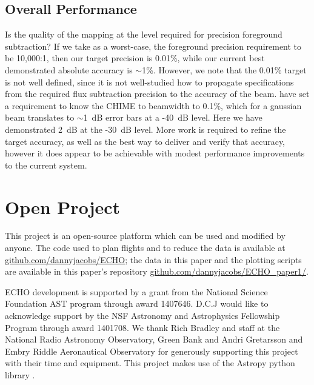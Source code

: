 \documentclass[preprint2,numberedappendix,tighten,twocolappendix]{aastex6}
\begin{document}
\subsection{Overall Performance}

Is the quality of the mapping at the level required for precision foreground subtraction?   If we take as a worst-case, the foreground precision requirement to be 10,000:1, then our target precision is 0.01\%, while our current best demonstrated absolute accuracy is $\sim$1\%.  However, we note that the 0.01\% target is not well defined, since it is not well-studied how to propagate specifications from the required flux subtraction precision to the accuracy of the beam. \citet{Shaw2015_chimemmodes} have set a requirement to know the CHIME to beamwidth to 0.1\%, which for a gaussian beam translates to $\sim$1~dB error bars at a -40~dB level. Here we have demonstrated 2~dB at the -30~dB level.  More work is required to refine the target accuracy, as well as the best way to deliver and verify that accuracy, however it does appear to be achievable with modest performance improvements to the current system.




\section*{Open Project}
This project is an open-source platform which can be used and modified by anyone. The code used to plan flights and to reduce the data is available at \url{github.com/dannyjacobs/ECHO}; the data in this paper and the plotting scripts are available in this paper's repository \url{github.com/dannyjacobs/ECHO_paper1/}.





\acknowledgments
ECHO development is supported by a grant from the National Science Foundation AST program through award 1407646. D.C.J would like to acknowledge support by the NSF Astronomy and Astrophysics Fellowship Program through award 1401708.  We thank Rich Bradley and staff at the National Radio Astronomy Observatory, Green Bank and Andri Gretarsson and Embry Riddle Aeronautical Observatory for generously supporting this project with their time and equipment. This project makes use of the Astropy python library \citep{2013Robitaille_Astropy}.



\end{document}
